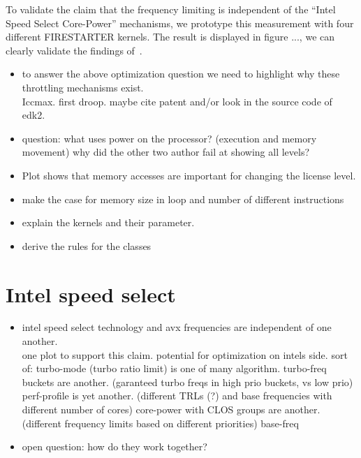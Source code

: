 To validate the claim that the frequency limiting is independent of the ``Intel Speed Select Core-Power'' mechanisms, we prototype this measurement with four different FIRESTARTER kernels.
The result is displayed in figure ..., we can clearly validate the findings of~.



\begin{itemize}
    \item to answer the above optimization question we need to highlight why these throttling mechanisms exist.\\
    Iccmax. first droop. maybe cite patent and/or look in the source code of edk2.
    \item question: what uses power on the processor? (execution and memory movement)
    why did the other two author fail at showing all levels?
    \item Plot shows that memory accesses are important for changing the license level.
    \item make the case for memory size in loop and number of different instructions
    \item explain the kernels and their parameter.
    \item derive the rules for the classes
\end{itemize}



\section{Intel speed select}
\label{sec:isst}

\begin{itemize}
    \item intel speed select technology and avx frequencies are independent of one another.\\
    one plot to support this claim. potential for optimization on intels side.
    sort of: turbo-mode (turbo ratio limit) is one of many algorithm.
    turbo-freq buckets are another. (garanteed turbo freqs in high prio buckets, vs low prio)
    perf-profile is yet another. (different TRLs (?) and base frequencies with different number of cores)
    core-power with CLOS groups are another. (different frequency limits based on different priorities)
    base-freq
    \item open question: how do they work together?
\end{itemize}

